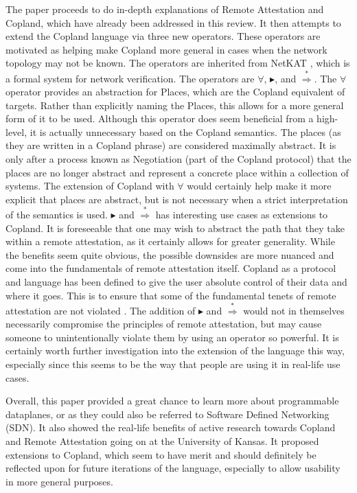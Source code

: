 \documentclass[12pt]{article}
\begin{document}
    The paper \cite{prog_data} proceeds to do in-depth explanations of Remote Attestation and Copland, which have already been addressed in this review. It then attempts to extend the Copland language via three new operators. These operators are motivated as helping make Copland more general in cases when the network topology may not be known. The operators are inherited from NetKAT \cite{net_kat}, which is a formal system for network verification. The operators are $\forall$, $\blacktriangleright$, and $\overset{*}{\Rightarrow}$. The $\forall$ operator provides an abstraction for Places, which are the Copland equivalent of targets. Rather than explicitly naming the Places, this allows for a more general form of it to be used. Although this operator does seem beneficial from a high-level, it is actually unnecessary based on the Copland semantics. The places (as they are written in a Copland phrase) are considered maximally abstract. It is only after a process known as Negotiation (part of the Copland protocol) that the places are no longer abstract and represent a concrete place within a collection of systems. The extension of Copland with $\forall$ would certainly help make it more explicit that places are abstract, but is not necessary when a strict interpretation of the semantics is used. $\blacktriangleright$ and $\overset{*}{\Rightarrow}$ has interesting use cases as extensions to Copland. It is foreseeable that one may wish to abstract the path that they take within a remote attestation, as it certainly allows for greater generality. While the benefits seem quite obvious, the possible downsides are more nuanced and come into the fundamentals of remote attestation itself. Copland as a protocol and language has been defined to give the user absolute control of their data and where it goes. This is to ensure that some of the fundamental tenets of remote attestation are not violated \cite{principles}. The addition of $\blacktriangleright$ and $\overset{*}{\Rightarrow}$ would not in themselves necessarily compromise the principles of remote attestation, but may cause someone to unintentionally violate them by using an operator so powerful. It is certainly worth further investigation into the extension of the language this way, especially since this seems to be the way that people are using it in real-life use cases. 

    Overall, this paper provided a great chance to learn more about programmable dataplanes, or as they could also be referred to Software Defined Networking (SDN). It also showed the real-life benefits of active research towards Copland and Remote Attestation going on at the University of Kansas. It proposed extensions to Copland, which seem to have merit and should definitely be reflected upon for future iterations of the language, especially to allow usability in more general purposes.
    \pagebreak


    \printbibliography
\end{document}
